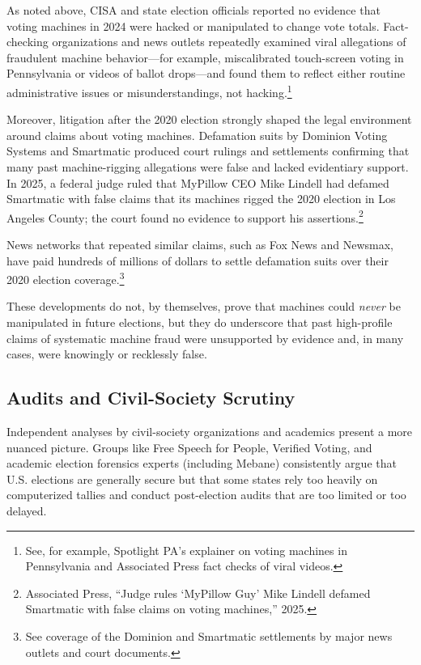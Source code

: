 \documentclass[12pt]{article}
\begin{document}
As noted above, CISA and state election officials reported no evidence that voting machines in 2024 were hacked or manipulated to change vote totals. Fact-checking organizations and news outlets repeatedly examined viral allegations of fraudulent machine behavior---for example, miscalibrated touch-screen voting in Pennsylvania or videos of ballot drops---and found them to reflect either routine administrative issues or misunderstandings, not hacking.\footnote{See, for example, Spotlight PA's explainer on voting machines in Pennsylvania and Associated Press fact checks of viral videos.}

Moreover, litigation after the 2020 election strongly shaped the legal environment around claims about voting machines. Defamation suits by Dominion Voting Systems and Smartmatic produced court rulings and settlements confirming that many past machine-rigging allegations were false and lacked evidentiary support. In 2025, a federal judge ruled that MyPillow CEO Mike Lindell had defamed Smartmatic with false claims that its machines rigged the 2020 election in Los Angeles County; the court found no evidence to support his assertions.\footnote{Associated Press, ``Judge rules `MyPillow Guy' Mike Lindell defamed Smartmatic with false claims on voting machines,'' 2025.}

News networks that repeated similar claims, such as Fox News and Newsmax, have paid hundreds of millions of dollars to settle defamation suits over their 2020 election coverage.\footnote{See coverage of the Dominion and Smartmatic settlements by major news outlets and court documents.}

These developments do not, by themselves, prove that machines could \emph{never} be manipulated in future elections, but they do underscore that past high-profile claims of systematic machine fraud were unsupported by evidence and, in many cases, were knowingly or recklessly false.

\subsection{Audits and Civil-Society Scrutiny}

Independent analyses by civil-society organizations and academics present a more nuanced picture. Groups like Free Speech for People, Verified Voting, and academic election forensics experts (including Mebane) consistently argue that U.S. elections are generally secure but that some states rely too heavily on computerized tallies and conduct post-election audits that are too limited or too delayed.
\end{document}
